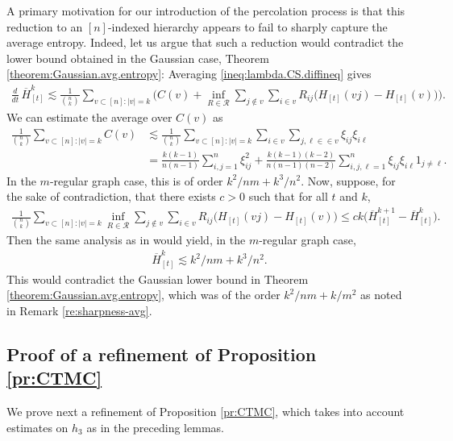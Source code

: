 \documentclass[11pt,reqno]{amsart}
\numberwithin{equation}{section}
\theoremstyle{definition}
\def\CC{{C}}
\begin{document}
	

A primary motivation for our introduction of the percolation process is that this reduction to an $[n]$-indexed hierarchy appears to fail to sharply capture the average entropy. Indeed, let us argue that such a reduction would contradict the lower bound obtained in the Gaussian case, Theorem \ref{theorem:Gaussian.avg.entropy}:
Averaging \eqref{ineq:lambda.CS.diffineq}  gives
		\begin{align*}
			\frac{d}{dt}\,\overline{H}_{[t]}^k
			\lesssim
			\frac{1}{{n \choose k}} \sum_{v\subset [n] : |v|=k}\bigg(\CC(v)
			+
			 \inf_{R \in \mathcal{R}}\sum_{j \notin v}\sum_{i \in v}
			R_{ij}\big(H_{[t]}(vj) - H_{[t]}(v)\big)\bigg).
		\end{align*}
		We can estimate the average over $C(v)$ as
		\begin{align*}
		\frac{1}{{n \choose k}} \sum_{v\subset [n] : |v|=k} C(v) &\lesssim \frac{1}{{n \choose k}} \sum_{v\subset [n] : |v|=k}\sum_{i \in v} \sum_{j,\ell \in \in v} \xi_{ij}\xi_{i\ell} \\
				&= \frac{k(k-1)}{n(n-1)}\sum_{i,j=1}^n \xi_{ij}^2 + \frac{k(k-1)(k-2)}{n(n-1)(n-2)}\sum_{i,j,\ell=1}^n \xi_{ij}\xi_{i\ell} 1_{j \neq \ell}.
		\end{align*}
		In the $m$-regular graph case, this is of order $k^2/nm+k^3/n^2$.
		Now, suppose, for the sake of contradiction, that there exists $c>0$ such that for all $t$ and $k$,
		\begin{align*}
			\frac{1}{{n \choose k}} \sum_{v\subset [n] : |v|=k}\inf_{R \in \mathcal{R}}\sum_{j \notin v}\sum_{i\in v}
			R_{ij}\big(H_{[t]}(vj) - H_{[t]}(v)\big)
			\le ck \big(\overline{H}_{[t]}^{k+1} - \overline{H}_{[t]}^{k}\big).
		\end{align*}
		Then the same analysis as in \cite{lacker2022hierarchies} would yield, in the $m$-regular graph case,
		\begin{align*}
			\overline{H}_{[t]}^{k} \lesssim k^2/nm + k^3/n^2.
		\end{align*}
		This would contradict the Gaussian lower bound in Theorem \ref{theorem:Gaussian.avg.entropy}, which was of the order $k^2/nm + k/m^2$ as noted in Remark \ref{re:sharpness-avg}. 
	

\subsection{Proof of a refinement of Proposition \ref{pr:CTMC}} \label{subsec:proof.thm.2.7}
We prove next a refinement of Proposition \ref{pr:CTMC}, which takes into account estimates on $h_3$ as in the preceding lemmas.
\end{document}
